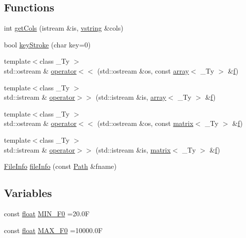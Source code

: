 \subsection*{Functions}
\begin{DoxyCompactItemize}
\item 
int \hyperlink{namespaceupc_a97b8e57e112ba7b34bf233ad20b82751}{get\+Cols} (istream \&is, \hyperlink{namespaceupc_ab61343ef80507c505066d99a281645ee}{vstring} \&cols)
\item 
bool \hyperlink{namespaceupc_a3caf6fbcaba76b586577cab2d8b8bea0}{key\+Stroke} (char key=0)
\item 
{\footnotesize template$<$class \+\_\+\+Ty $>$ }\\std\+::ostream \& \hyperlink{namespaceupc_ab2fd910b16bf8e101ab813f01ca242e9}{operator$<$$<$} (std\+::ostream \&os, const \hyperlink{classupc_1_1array}{array}$<$ \+\_\+\+Ty $>$ \&\hyperlink{FFTReal__readme_8txt_abbf3cc73d1e3e4714ab1639819396eca}{f})
\item 
{\footnotesize template$<$class \+\_\+\+Ty $>$ }\\std\+::istream \& \hyperlink{namespaceupc_ac501f17fd16a4120101674beee8802b5}{operator$>$$>$} (std\+::istream \&is, \hyperlink{classupc_1_1array}{array}$<$ \+\_\+\+Ty $>$ \&\hyperlink{FFTReal__readme_8txt_abbf3cc73d1e3e4714ab1639819396eca}{f})
\item 
{\footnotesize template$<$class \+\_\+\+Ty $>$ }\\std\+::ostream \& \hyperlink{namespaceupc_ac42418ad9ea80d45b868329d67c315c5}{operator$<$$<$} (std\+::ostream \&os, const \hyperlink{classupc_1_1matrix}{matrix}$<$ \+\_\+\+Ty $>$ \&\hyperlink{FFTReal__readme_8txt_abbf3cc73d1e3e4714ab1639819396eca}{f})
\item 
{\footnotesize template$<$class \+\_\+\+Ty $>$ }\\std\+::istream \& \hyperlink{namespaceupc_a9d33040c9285f9e546a2cdccb017e246}{operator$>$$>$} (std\+::istream \&is, \hyperlink{classupc_1_1matrix}{matrix}$<$ \+\_\+\+Ty $>$ \&\hyperlink{FFTReal__readme_8txt_abbf3cc73d1e3e4714ab1639819396eca}{f})
\item 
\hyperlink{classupc_1_1FileInfo}{File\+Info} \hyperlink{namespaceupc_a4c5e814ef76fc815a67f0de482283ff5}{file\+Info} (const \hyperlink{classupc_1_1Path}{Path} \&fname)
\end{DoxyCompactItemize}
\subsection*{Variables}
\begin{DoxyCompactItemize}
\item 
const \hyperlink{FFTReal__readme_8txt_a0ea2fae2a8106200bf378b90eae003cf}{float} \hyperlink{namespaceupc_ae8ed4ce6dc2c05dfc1aa6432db41e1ae}{M\+I\+N\+\_\+\+F0} =20.\+0F
\item 
const \hyperlink{FFTReal__readme_8txt_a0ea2fae2a8106200bf378b90eae003cf}{float} \hyperlink{namespaceupc_ab69be42753266b6e1a0deaa8eba56a19}{M\+A\+X\+\_\+\+F0} =10000.\+0F
\end{DoxyCompactItemize}



